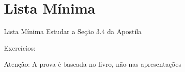 
\section{Lista Mínima}

\begin{frame}{Lista Mínima}
  Estudar a Seção 3.4 da Apostila

  Exercícios:

  \vfill
  Atenção: A prova é baseada no livro, não nas apresentações
\end{frame}


